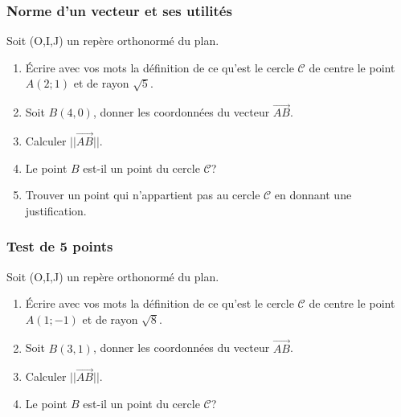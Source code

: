 \documentclass[t,12pt]{beamer}
\newcommand{\V}{\overrightarrow}
\begin{document}
\begin{frame}
\frametitle{Norme d'un vecteur et ses utilités }
Soit (O,I,J) un repère orthonormé du plan. \\[0.25cm]
\begin{enumerate}
	\item Écrire avec vos mots la définition de ce qu'est le cercle $\mathcal{C}$ de centre le point $A(2;1)$ et de rayon $\sqrt{5}$.\\[0.25cm]
	\item Soit $B(4,0)$, donner les coordonnées du vecteur $\V{AB}$.\\[0.25cm]
	\item Calculer $||\V{AB}||$. \\[0.25cm]
	\item Le point $B$ est-il un point du cercle $\mathcal{C}$?\\[0.25cm]
	\item Trouver un point qui n'appartient pas au cercle $\mathcal{C}$ en donnant une justification. 
\end{enumerate}

\end{frame}

\begin{frame}
	
\end{frame}

\begin{frame}
	\frametitle{Test de 5 points}
	Soit (O,I,J) un repère orthonormé du plan. \\[0.25cm]
	\begin{enumerate}
		\item Écrire avec vos mots la définition de ce qu'est le cercle $\mathcal{C}$ de centre le point $A(1;-1)$ et de rayon $\sqrt{8}$.\\[0.25cm]
		\item Soit $B(3,1)$, donner les coordonnées du vecteur $\V{AB}$.\\[0.25cm]
		\item Calculer $||\V{AB}||$. \\[0.25cm]
		\item Le point $B$ est-il un point du cercle $\mathcal{C}$?\\[0.25cm]
	\end{enumerate}
	
\end{frame}
\end{document}
